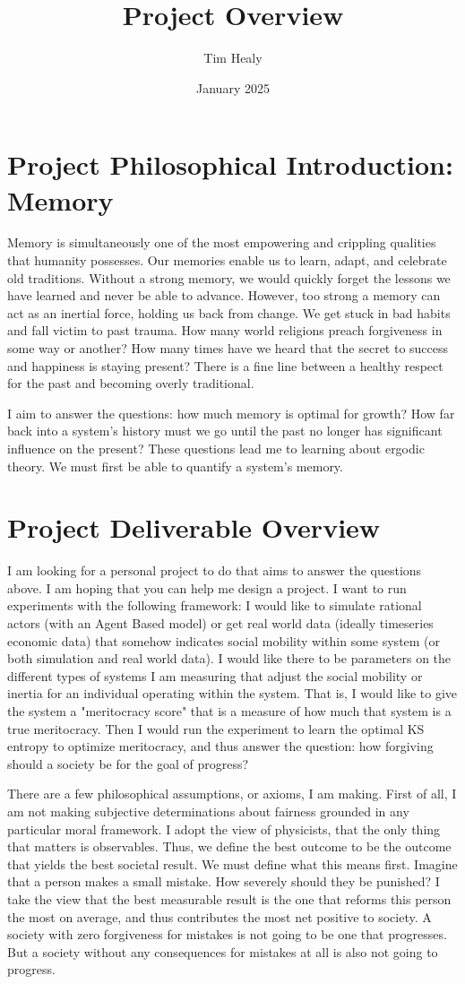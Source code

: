 \documentclass{article}
\title{Project Overview}
\author{Tim Healy}
\date{January 2025}
\begin{document}
\section{Project Philosophical Introduction: Memory}

Memory is simultaneously one of the most empowering and crippling qualities that humanity possesses. Our memories enable us to learn, adapt, and celebrate old traditions.  Without a strong memory, we would quickly forget the lessons we have learned and never be able to advance. However, too strong a memory can act as an inertial force, holding us back from change. We get stuck in bad habits and fall victim to past trauma. How many world religions preach forgiveness in some way or another? How many times have we heard that the secret to success and happiness is staying present? There is a fine line between a healthy respect for the past and becoming overly traditional. 

I aim to answer the questions: how much memory is optimal for growth? How far back into a system's history must we go until the past no longer has significant influence on the present? These questions lead me to learning about ergodic theory. We must first be able to quantify a system's memory.

\section{Project Deliverable Overview}
I am looking for a personal project to do that aims to answer the questions above. I am hoping that you can help me design a project. I want to run experiments with the following framework: I would like to simulate rational actors (with an Agent Based model) or get real world data (ideally timeseries economic data) that somehow indicates social mobility within some system (or both simulation and real world data). I would like there to be parameters on the different types of systems I am measuring that adjust the social mobility or inertia for an individual operating within the system. That is, I would like to give the system a "meritocracy score" that is a measure of how much that system is a true meritocracy. Then I would run the experiment to learn the optimal KS entropy to optimize meritocracy, and thus answer the question: how forgiving should a society be for the goal of progress?

There are a few philosophical assumptions, or axioms, I am making. First of all, I am not making subjective determinations about fairness grounded in any particular moral framework. I adopt the view of physicists, that the only thing that matters is observables. Thus, we define the best outcome to be the outcome that yields the best societal result. We must define what this means first. Imagine that a person makes a small mistake. How severely should they be punished? I take the view that the best measurable result is the one that reforms this person the most on average, and thus contributes the most net positive to society. A society with zero forgiveness for mistakes is not going to be one that progresses. But a society without any consequences for mistakes at all is also not going to progress.
\end{document}
